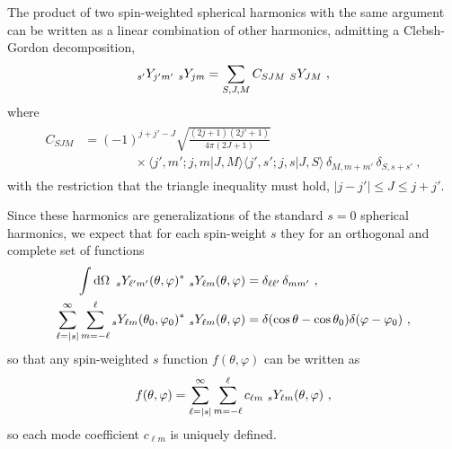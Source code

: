 The product of two spin-weighted spherical harmonics with the same argument can be written as a linear combination of other harmonics, admitting a Clebsh-Gordon decomposition,
\begin{align}
	\label{eqC:clebschGordanDecomp}
	\uu[s']{Y}{j' m'} ~\uu[s]{Y}{j m} = \sum_{S,J,M} C_{SJM} ~\uu[S]{Y}{JM} ~,
\end{align}
where
\begin{align}
	\begin{split}
		\label{eqC:clebschGordanCoef}
		C_{SJM} &= (-1)^{j+j'-J} \sqrt{\frac{(2j+1)(2j'+1)}{4\pi(2J+1)}} \\
		&\qquad\qquad \times \langle j',m' ; j, m | J,M \rangle\langle j',s' ; j, s | J, S \rangle \,\delta_{M,m+m'} \,\delta_{S,s+s'} ~,
	\end{split}
\end{align}
with the restriction that the triangle inequality must hold, $|j - j'|\le J \le j+j'$. 

Since these harmonics are generalizations of the standard $s=0$ spherical harmonics, we expect that for each spin-weight $s$ they for an orthogonal and complete set of functions
\begin{align}
	\begin{split}
		\int \dd \Omega ~\,\uu[s]{Y}{\ell' m'}(\theta,\varphi)^* ~\uu[s]{Y}{\ell m}(\theta,\varphi) &= \delta_{\ell\ell'} \,\delta_{mm'} ~,\\
		\sum_{\ell=|s|}^\infty \sum_{m=-\ell}^\ell \uu[s]{Y}{\ell m}(\theta_0,\varphi_0)^* ~\uu[s]{Y}{\ell m}(\theta,\varphi) &= \delta(\cos\theta - \cos\theta_0) \delta(\varphi - \varphi_0) ~,
	\end{split}
\end{align}
so that any spin-weighted $s$ function $f(\theta,\varphi)$ can be written as
\begin{align}
	\begin{split}
		f(\theta,\varphi) = \sum_{\ell=|s|}^\infty \sum_{m=-\ell}^\ell c_{\ell m} ~\uu[s]{Y}{\ell m}(\theta,\varphi) ~,
	\end{split}
\end{align}
so each mode coefficient $c_{\ell m}$ is uniquely defined.